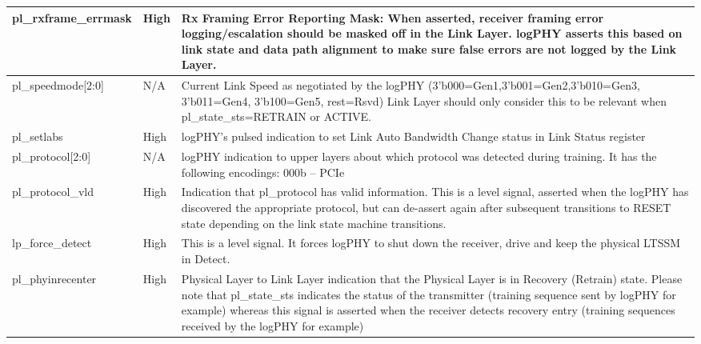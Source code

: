 \begin{table}[H]
\begin{tabular}{ |m{26mm}|P{18mm}|m{60mm}|  }
\\ \hline
\end{tabular}
\end{table}


\begin{table}[H]

    \centering
  \begin{tabular}{ |m{26mm}|P{18mm}|m{60mm}|  }
  \hline
pl\_rxframe\_errmask & High & Rx Framing Error Reporting Mask:
When asserted, receiver framing error logging/escalation should be masked off in the
Link Layer. logPHY asserts this based on link state and data path alignment to make
sure false errors are not logged by the Link Layer.
\\ \hline
pl\_speedmode[2:0] & N/A & Current Link Speed as negotiated by the logPHY
(3’b000=Gen1,3’b001=Gen2,3’b010=Gen3, 3’b011=Gen4, 3’b100=Gen5, rest=Rsvd)
Link Layer should only consider this to be relevant when pl\_state\_sts=RETRAIN or
ACTIVE. \\ \hline
pl\_setlabs & High & logPHY’s pulsed indication to set Link Auto Bandwidth Change status in Link Status register \\ \hline
pl\_protocol[2:0] & N/A & logPHY indication to upper layers about which protocol was detected during training. It
has the following encodings: \newline
000b – PCIe \\ \hline
pl\_protocol\_vld & High & 
Indication that pl\_protocol has valid information. This is a level signal, asserted when
the logPHY has discovered the appropriate protocol, but can de-assert again after
subsequent transitions to RESET state depending on the link state machine transitions. \\ \hline
lp\_force\_detect & High & This is a level signal. It forces logPHY to shut down the receiver, drive and keep the
physical LTSSM in Detect. \\ \hline
pl\_phyinrecenter & High & Physical Layer to Link Layer indication that the Physical Layer is in Recovery (Retrain)
state. Please note that pl\_state\_sts indicates the status of the transmitter (training
sequence sent by logPHY for example) whereas this signal is asserted when the receiver
detects recovery entry (training sequences received by the logPHY for example) \\ \hline
\end{tabular}
\end{table}

